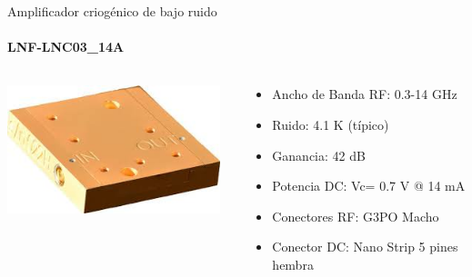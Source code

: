 \documentclass[ignorenonframetext,12pt]{beamer}
\begin{document}
				\begin{frame}{Amplificador criog\'enico de bajo ruido}
								\framesubtitle{LNF-LNC03\_14A}
								\begin{columns}
												\begin{column}{0.40\textwidth}
																\hspace{10mm}\includegraphics[width=0.95\textwidth]{lnf-lnc03_14sa}
												\end{column}
												\begin{column}{0.60\textwidth}
																\begin{itemize}
																				\item Ancho de Banda RF: 0.3-14 GHz
																				\item Ruido: 4.1 K (típico)
																				\item Ganancia: 42 dB
																				\item Potencia DC: Vc= 0.7 V @ 14 mA
																				\item Conectores RF: G3PO Macho
																				\item Conector DC: Nano Strip 5 pines hembra
																\end{itemize}
												\end{column}
								\end{columns}
				\end{frame}



\end{document}
